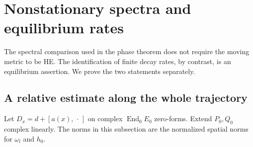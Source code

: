 \documentclass[11pt]{amsart}
\theoremstyle{definition}
\theoremstyle{remark}
\newcommand{\End}{\operatorname{End}}
\begin{document}
\section{Nonstationary spectra and equilibrium rates}\label{sec:spectra}

The spectral comparison used in the phase theorem does not require
the moving metric to be HE. The identification of finite decay rates,
by contrast, is an equilibrium assertion. We prove the two statements
separately.

\subsection{A relative estimate along the whole trajectory}
Let $D_x=d+[a(x),\,\cdot\,]$ on complex $\End_0E_0$ zero-forms.
Extend $P_0,Q_0$ complex linearly. The norms in this subsection are
the normalized spatial norms for $\omega_l$ and $h_0$.
\end{document}
